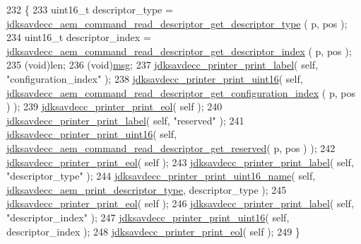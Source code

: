 \begin{DoxyCode}
232 \{
233     uint16\_t descriptor\_type = 
      \hyperlink{group__command__read__descriptor_gaa141e1ed9bc9fd0176ab593146aa6ef2}{jdksavdecc\_aem\_command\_read\_descriptor\_get\_descriptor\_type}
      ( p, pos );
234     uint16\_t descriptor\_index = 
      \hyperlink{group__command__read__descriptor_gabfc491b799a6904e6c80e95c62755e0b}{jdksavdecc\_aem\_command\_read\_descriptor\_get\_descriptor\_index}
      ( p, pos );
235     (void)len;
236     (void)\hyperlink{maap__log__linux_8c_a0c7e58a50354c4a4d6dad428d0e47029}{msg};
237     \hyperlink{group__util_gaf7818b24143b3c7502926a425a242ff5}{jdksavdecc\_printer\_print\_label}( \textcolor{keyword}{self}, \textcolor{stringliteral}{"configuration\_index"} );
238     \hyperlink{group__util_ga9793e0ff8e7ed25d957282ee6b257ce2}{jdksavdecc\_printer\_print\_uint16}( \textcolor{keyword}{self}, 
      \hyperlink{group__command__read__descriptor_ga0891905ce973732e8e344a90479dc123}{jdksavdecc\_aem\_command\_read\_descriptor\_get\_configuration\_index}
      ( p, pos ) );
239     \hyperlink{group__util_gacda56c9d3d24593a52c999682fa6e6e3}{jdksavdecc\_printer\_print\_eol}( \textcolor{keyword}{self} );
240     \hyperlink{group__util_gaf7818b24143b3c7502926a425a242ff5}{jdksavdecc\_printer\_print\_label}( \textcolor{keyword}{self}, \textcolor{stringliteral}{"reserved"} );
241     \hyperlink{group__util_ga9793e0ff8e7ed25d957282ee6b257ce2}{jdksavdecc\_printer\_print\_uint16}( \textcolor{keyword}{self}, 
      \hyperlink{group__command__read__descriptor_gad089600c29b50bb476ad567af318e89c}{jdksavdecc\_aem\_command\_read\_descriptor\_get\_reserved}( p, 
      pos ) );
242     \hyperlink{group__util_gacda56c9d3d24593a52c999682fa6e6e3}{jdksavdecc\_printer\_print\_eol}( \textcolor{keyword}{self} );
243     \hyperlink{group__util_gaf7818b24143b3c7502926a425a242ff5}{jdksavdecc\_printer\_print\_label}( \textcolor{keyword}{self}, \textcolor{stringliteral}{"descriptor\_type"} );
244     \hyperlink{group__util_ga62486d864a66773d19bbbe23cebf346a}{jdksavdecc\_printer\_print\_uint16\_name}( \textcolor{keyword}{self}, 
      \hyperlink{group__aem__print_gabb4f27bdad61aeaf875d91f408b7199d}{jdksavdecc\_aem\_print\_descriptor\_type}, descriptor\_type );
245     \hyperlink{group__util_gacda56c9d3d24593a52c999682fa6e6e3}{jdksavdecc\_printer\_print\_eol}( \textcolor{keyword}{self} );
246     \hyperlink{group__util_gaf7818b24143b3c7502926a425a242ff5}{jdksavdecc\_printer\_print\_label}( \textcolor{keyword}{self}, \textcolor{stringliteral}{"descriptor\_index"} );
247     \hyperlink{group__util_ga9793e0ff8e7ed25d957282ee6b257ce2}{jdksavdecc\_printer\_print\_uint16}( \textcolor{keyword}{self}, descriptor\_index );
248     \hyperlink{group__util_gacda56c9d3d24593a52c999682fa6e6e3}{jdksavdecc\_printer\_print\_eol}( \textcolor{keyword}{self} );
249 \}
\end{DoxyCode}


